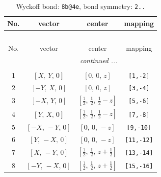 \documentclass[fleqn,8pt]{jsarticle}
\begin{document}
\begin{longtable}{cccc}
\caption{Wyckoff bond: {\tt 8b@4e}, bond symmetry: {\tt 2..}}
 \\
 \hline \hline
No. & vector & center & mapping \\ \hline \endfirsthead

\multicolumn{3}{l}{\tablename\ \thetable{}} \\
 \hline \hline
No. & vector & center & mapping \\ \hline \endhead

 \hline \hline
\multicolumn{3}{r}{\footnotesize\it continued ...} \\ \endfoot

 \hline \hline
\multicolumn{3}{r}{} \\ \endlastfoot

1 & $\left[ X,\, Y,\, 0 \right]$ & $\left[ 0,\, 0,\, z \right]$ & {\tt [1,-2]} \\ \hline
2 & $\left[ - Y,\, X,\, 0 \right]$ & $\left[ 0,\, 0,\, z \right]$ & {\tt [3,-4]} \\ \hline
3 & $\left[ - X,\, Y,\, 0 \right]$ & $\left[ \frac{1}{2},\, \frac{1}{2},\, \frac{1}{2} - z \right]$ & {\tt [5,-6]} \\ \hline
4 & $\left[ Y,\, X,\, 0 \right]$ & $\left[ \frac{1}{2},\, \frac{1}{2},\, \frac{1}{2} - z \right]$ & {\tt [7,-8]} \\ \hline
5 & $\left[ - X,\, - Y,\, 0 \right]$ & $\left[ 0,\, 0,\, - z \right]$ & {\tt [9,-10]} \\ \hline
6 & $\left[ Y,\, - X,\, 0 \right]$ & $\left[ 0,\, 0,\, - z \right]$ & {\tt [11,-12]} \\ \hline
7 & $\left[ X,\, - Y,\, 0 \right]$ & $\left[ \frac{1}{2},\, \frac{1}{2},\, z + \frac{1}{2} \right]$ & {\tt [13,-14]} \\ \hline
8 & $\left[ - Y,\, - X,\, 0 \right]$ & $\left[ \frac{1}{2},\, \frac{1}{2},\, z + \frac{1}{2} \right]$ & {\tt [15,-16]} \\
\end{longtable}
\renewcommand{\arraystretch}{1.2}
\end{document}
